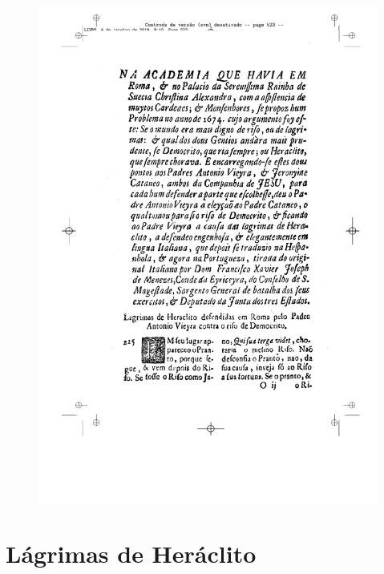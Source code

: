 \pagebreak
\thispagestyle{empty}
\movetoevenpage
\begin{figure}
\includegraphics[width=\textwidth]{./imgs/heraclito.pdf}  
\end{figure}

\chapter{Lágrimas de Heráclito}


